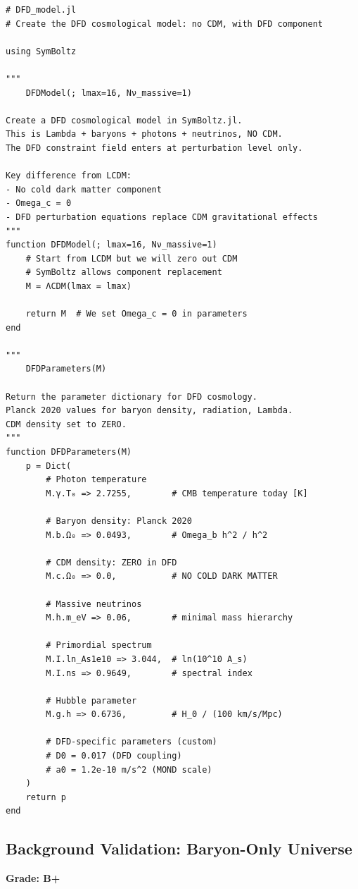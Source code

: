 \documentclass[11pt,a4paper]{article}
\begin{document}
\begin{lstlisting}[caption={Creating a no-CDM DFD cosmological model},label={lst:nocdm}]
# DFD_model.jl
# Create the DFD cosmological model: no CDM, with DFD component

using SymBoltz

"""
    DFDModel(; lmax=16, Nν_massive=1)

Create a DFD cosmological model in SymBoltz.jl.
This is Lambda + baryons + photons + neutrinos, NO CDM.
The DFD constraint field enters at perturbation level only.

Key difference from LCDM:
- No cold dark matter component
- Omega_c = 0
- DFD perturbation equations replace CDM gravitational effects
"""
function DFDModel(; lmax=16, Nν_massive=1)
    # Start from LCDM but we will zero out CDM
    # SymBoltz allows component replacement
    M = ΛCDM(lmax = lmax)

    return M  # We set Omega_c = 0 in parameters
end

"""
    DFDParameters(M)

Return the parameter dictionary for DFD cosmology.
Planck 2020 values for baryon density, radiation, Lambda.
CDM density set to ZERO.
"""
function DFDParameters(M)
    p = Dict(
        # Photon temperature
        M.γ.T₀ => 2.7255,        # CMB temperature today [K]

        # Baryon density: Planck 2020
        M.b.Ω₀ => 0.0493,        # Omega_b h^2 / h^2

        # CDM density: ZERO in DFD
        M.c.Ω₀ => 0.0,           # NO COLD DARK MATTER

        # Massive neutrinos
        M.h.m_eV => 0.06,        # minimal mass hierarchy

        # Primordial spectrum
        M.I.ln_As1e10 => 3.044,  # ln(10^10 A_s)
        M.I.ns => 0.9649,        # spectral index

        # Hubble parameter
        M.g.h => 0.6736,         # H_0 / (100 km/s/Mpc)

        # DFD-specific parameters (custom)
        # D0 = 0.017 (DFD coupling)
        # a0 = 1.2e-10 m/s^2 (MOND scale)
    )
    return p
end
\end{lstlisting}

\subsection{Background Validation: Baryon-Only Universe}

\textbf{Grade: B+}
\end{document}
